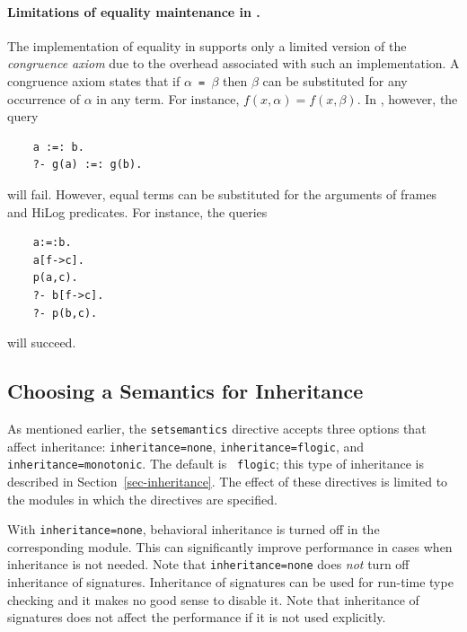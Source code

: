 \documentclass[11pt]{article}
\newcommand{\ERGO}{\mbox{\smaller{\ensuremath{\cal{E}}\smaller{{\sc{RGO}}}}}\xspace}
\newcommand{\FLSYSTEM}{\ERGO}
\begin{document}
\paragraph{Limitations of equality maintenance in \FLSYSTEM.}
The implementation of equality in \FLSYSTEM supports only a limited
version of the
\emph{congruence axiom} due to the overhead associated with such an
implementation. A congruence axiom states that if {\tt $\alpha$ = $\beta$}
then {\tt $\beta$} can be substituted for any occurrence of $\alpha$ in any
term. For instance, $f(x,\alpha) = f(x,\beta)$. In \FLSYSTEM, however, the query
\begin{verbatim}
    a :=: b.
    ?- g(a) :=: g(b).
\end{verbatim}
will fail. However,
equal terms can be substituted for the arguments of
frames and HiLog predicates. For instance, the queries
\begin{verbatim}
    a:=:b.
    a[f->c].
    p(a,c).
    ?- b[f->c].  
    ?- p(b,c).
\end{verbatim}
will succeed.


\subsection{Choosing a Semantics for Inheritance}\label{sec-inheritance-directive}

As mentioned earlier, the {\tt setsemantics} directive accepts three
options that affect inheritance:
{\tt inheritance=none}, {\tt inheritance=flogic}, and
\texttt{inheritance=monotonic}.  The default is {\tt
  flogic}; this type of inheritance is described in
Section~\ref{sec-inheritance}.
The effect of these directives is limited to the modules in which
the directives are specified.

With {\tt inheritance=none}, behavioral inheritance is turned off in the
corresponding module.  This can significantly improve performance in cases
when inheritance is not needed.
Note that {\tt inheritance=none} does \emph{not} turn off inheritance of
signatures. Inheritance of signatures can be used for run-time type checking
and it makes no good sense to disable it. Note that inheritance of
signatures does not affect the performance if it is not used explicitly.
\end{document}
